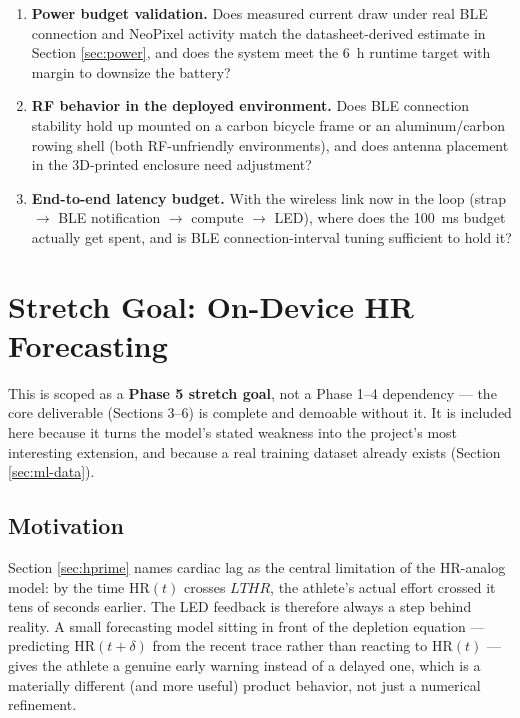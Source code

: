 \documentclass[11pt, letterpaper]{article}
\begin{document}
\begin{enumerate}
  \item \textbf{Power budget validation.} Does measured current draw under real BLE connection
    and NeoPixel activity match the datasheet-derived estimate in Section \ref{sec:power}, and does the
    system meet the \SI{6}{\hour} runtime target with margin to downsize the battery?
  \item \textbf{RF behavior in the deployed environment.} Does BLE connection stability hold up
    mounted on a carbon bicycle frame or an aluminum/carbon rowing shell (both RF-unfriendly
    environments), and does antenna placement in the 3D-printed enclosure need adjustment?
  \item \textbf{End-to-end latency budget.} With the wireless link now in the loop (strap
    $\rightarrow$ BLE notification $\rightarrow$ compute $\rightarrow$ LED), where does the
    \SI{100}{\milli\second} budget actually get spent, and is BLE connection-interval tuning
    sufficient to hold it?
\end{enumerate}

\section{Stretch Goal: On-Device HR Forecasting}
\label{sec:ml-stretch}

This is scoped as a \textbf{Phase 5 stretch goal}, not a Phase 1--4 dependency --- the core
deliverable (Sections 3--6) is complete and demoable without it. It is included here because it
turns the model's stated weakness into the project's most interesting extension, and because a
real training dataset already exists (Section \ref{sec:ml-data}).

\subsection{Motivation}

Section \ref{sec:hprime} names cardiac lag as the central limitation of the HR-analog model: by
the time $\mathrm{HR}(t)$ crosses $LTHR$, the athlete's actual effort crossed it tens of seconds
earlier. The LED feedback is therefore always a step behind reality. A small forecasting model
sitting in front of the depletion equation --- predicting $\mathrm{HR}(t + \delta)$ from the
recent trace rather than reacting to $\mathrm{HR}(t)$ --- gives the athlete a genuine early
warning instead of a delayed one, which is a materially different (and more useful) product
behavior, not just a numerical refinement.
\end{document}
